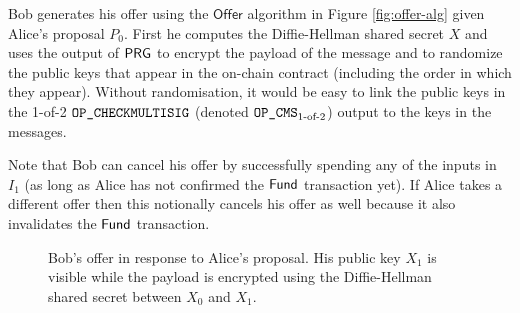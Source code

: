 \documentclass[runningheads]{llncs}
\begin{document}
Bob generates his offer using the $\textsf{Offer}$ algorithm in Figure \ref{fig:offer-alg} given Alice's proposal $P_0$. First he computes the Diffie-Hellman shared secret $X$ and uses the output of $\textsf{PRG}$ to encrypt the payload of the message and to randomize the public keys that appear in the on-chain contract (including the order in which they appear). Without randomisation, it would be easy to link the public keys in the 1-of-2 $\texttt{OP\_CHECKMULTISIG}$\cite{opcheckmultisig} (denoted $\texttt{OP\_CMS}_{\text{1-of-2}}$) output to the keys in the messages.

Note that Bob can cancel his offer by successfully spending any of the inputs in $I_1$ (as long as Alice has not confirmed the $\textsf{Fund}$ transaction yet). If Alice takes a different offer then this notionally cancels his offer as well because it also invalidates the $\textsf{Fund}$ transaction.

\begin{figure}[!h]
\centering
\caption{Bob's offer in response to Alice's proposal. His public key $X_1$ is visible while the payload is encrypted using the Diffie-Hellman shared secret between $X_0$ and $X_1$.}
\label{fig:bob-offer}
\end{figure}
\end{document}
